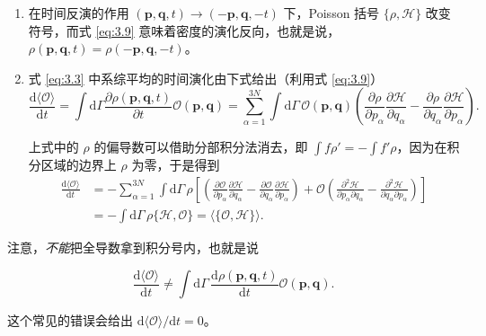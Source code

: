 \begin{enumerate}[itemsep=0.5em,topsep=0.4em]
  \item 在时间反演的作用 $(\bm p,\bm q,t)\to(-\bm p,\bm q,-t)$ 下，Poisson 括号 $\{\rho,\mathscr H\}$ 改变符号，而式 \eqref{eq:3.9} 意味着密度的演化反向，也就是说，$\rho(\bm p,\bm q,t)=\rho(-\bm p,\bm q,-t)$。

  \item 式 \eqref{eq:3.3} 中系综平均的时间演化由下式给出（利用式 \eqref{eq:3.9}）
  \begin{equation}\label{eq:3.11}
    \frac{\mathrm{d}\langle\mathcal{O}\rangle}{\mathrm{d}t}=\int \mathrm{d}\Gamma\frac{\partial\rho(\bm p,\bm q,t)}{\partial t}\mathcal{O}(\bm p,\bm q)
    =\sum_{\alpha=1}^{3N}\int \mathrm{d}\Gamma\,\mathcal{O}(\bm p,\bm q)\left(\frac{\partial\rho}{\partial p_\alpha}\frac{\partial\mathscr H}{\partial q_\alpha}-\frac{\partial\rho}{\partial q_\alpha}\frac{\partial\mathscr H}{\partial p_\alpha}\right).
  \end{equation}

  上式中的 $\rho$ 的偏导数可以借助分部积分法消去，即 $\int f\rho'=-\int f'\rho$，因为在积分区域的边界上 $\rho$ 为零，于是得到
  \begin{equation}\label{eq:3.12}
    \begin{aligned}
      \frac{\mathrm{d}\langle\mathcal{O}\rangle}{\mathrm{d}t}
      &=-\sum_{\alpha=1}^{3N}\int \mathrm{d}\Gamma\,\rho\left[\left(\frac{\partial\mathcal{O}}{\partial p_\alpha}\frac{\partial\mathscr H}{\partial q_\alpha}-\frac{\partial\mathcal{O}}{\partial q_\alpha}\frac{\partial\mathscr H}{\partial p_\alpha}\right)+\mathcal{O}\left(\frac{\partial^2\mathscr H}{\partial p_\alpha\partial q_\alpha}-\frac{\partial^2\mathscr H}{\partial q_\alpha\partial p_\alpha}\right)\right]\\[2pt]
      &=-\int \mathrm{d}\Gamma\,\rho\{\mathscr H,\mathcal{O}\}=\langle\{\mathcal{O},\mathscr H\}\rangle.
    \end{aligned}
  \end{equation}
\end{enumerate}

注意，\emph{不能}把全导数拿到积分号内，也就是说

\begin{equation}\label{eq:3.13}
  \frac{\mathrm{d}\langle\mathcal{O}\rangle}{\mathrm{d}t}\ne\int \mathrm{d}\Gamma\,\frac{\mathrm{d}\rho(\bm p,\bm q,t)}{\mathrm{d}t}\mathcal{O}(\bm p,\bm q).
\end{equation}

这个常见的错误会给出 $\mathrm{d}\langle\mathcal{O}\rangle/\mathrm{d}t=0$。

